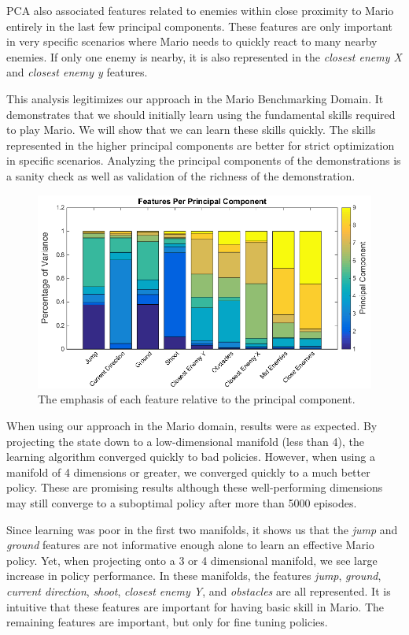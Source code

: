 \documentclass[twoside,11pt]{article}
\begin{document}
PCA also associated features related to enemies within close proximity to Mario entirely in the last few principal components. These features are only important in very specific scenarios where Mario needs to quickly react to many nearby enemies. If only one enemy is nearby, it is also represented in the \textit{closest enemy X} and \textit{closest enemy y} features.

This analysis legitimizes our approach in the Mario Benchmarking Domain. It demonstrates that we should initially learn using the fundamental skills required to play Mario. We will show that we can learn these skills quickly. The skills represented in the higher principal components are better for strict optimization in specific scenarios. Analyzing the principal components of the demonstrations is a sanity check as well as validation of the richness of the demonstration.

\begin{figure}[h!]
  \centering
      \includegraphics[width=.75\textwidth]{PCA}
  \caption{The emphasis of each feature relative to the principal component.}
  \label{fig:pca}
\end{figure}


When using our approach in the Mario domain, results were as expected. By projecting the state down to a low-dimensional manifold (less than 4), the learning algorithm converged quickly to bad policies. However, when using a manifold of 4 dimensions or greater, we converged quickly to a much better policy. These are promising results although these well-performing dimensions may still converge to a suboptimal policy after more than 5000 episodes.

Since learning was poor in the first two manifolds, it shows us that the \textit{jump} and \textit{ground} features are not informative enough alone to learn an effective Mario policy. Yet, when projecting onto a 3 or 4 dimensional manifold, we see large increase in policy performance. In these manifolds, the features \textit{jump}, \textit{ground}, \textit{current direction}, \textit{shoot}, \textit{closest enemy Y}, and \textit{obstacles} are all represented. It is intuitive that these features are important for having basic skill in Mario. The remaining features are important, but only for fine tuning policies. 
\end{document}
